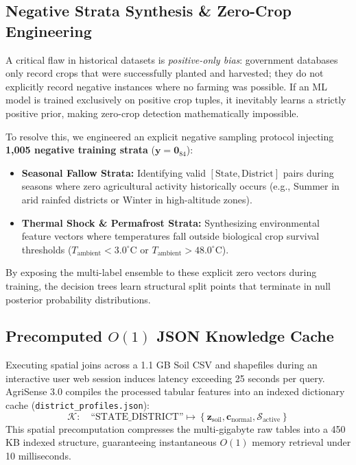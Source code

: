 \documentclass[conference]{IEEEtran}
\begin{document}
\subsection{Negative Strata Synthesis \& Zero-Crop Engineering}
A critical flaw in historical datasets is \textit{positive-only bias}: government databases only record crops that were successfully planted and harvested; they do not explicitly record negative instances where no farming was possible. If an ML model is trained exclusively on positive crop tuples, it inevitably learns a strictly positive prior, making zero-crop detection mathematically impossible.

To resolve this, we engineered an explicit negative sampling protocol injecting \textbf{1,005 negative training strata} ($\mathbf{y} = \mathbf{0}_{84}$):
\begin{itemize}
    \item \textbf{Seasonal Fallow Strata:} Identifying valid $[\text{State}, \text{District}]$ pairs during seasons where zero agricultural activity historically occurs (e.g., Summer in arid rainfed districts or Winter in high-altitude zones).
    \item \textbf{Thermal Shock \& Permafrost Strata:} Synthesizing environmental feature vectors where temperatures fall outside biological crop survival thresholds ($T_{\text{ambient}} < 3.0^\circ\text{C}$ or $T_{\text{ambient}} > 48.0^\circ\text{C}$).
\end{itemize}
By exposing the multi-label ensemble to these explicit zero vectors during training, the decision trees learn structural split points that terminate in null posterior probability distributions.

\subsection{Precomputed $O(1)$ JSON Knowledge Cache}
Executing spatial joins across a 1.1 GB Soil CSV and shapefiles during an interactive user web session induces latency exceeding 25 seconds per query. AgriSense 3.0 compiles the processed tabular features into an indexed dictionary cache (\verb|district_profiles.json|):
\begin{equation}
\mathcal{K}: \quad \text{``STATE\_DISTRICT''} \mapsto \left\{ \mathbf{z}_{\text{soil}}, \mathbf{c}_{\text{normal}}, \mathcal{S}_{\text{active}} \right\}
\end{equation}
This spatial precomputation compresses the multi-gigabyte raw tables into a 450 KB indexed structure, guaranteeing instantaneous $O(1)$ memory retrieval under 10 milliseconds.
\end{document}
